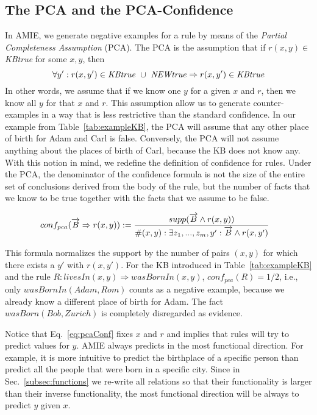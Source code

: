 \subsection{The PCA and the PCA-Confidence}\label{subsubsec:pcaConf}

In AMIE, we generate negative examples for a rule by means of the \emph{Partial Completeness Assumption} (PCA).
The PCA is the assumption that if $r(x,y) \in$ \emph{KBtrue} for some $x,y$, then
\[\forall y': r(x,y') \in \mbox{\emph{KBtrue}}\ \cup\ \mbox{\emph{NEWtrue}} \Rightarrow r(x,y') \in \mbox{\emph{KBtrue}}\]
In other words, we assume that if we know one $y$ for a given $x$ and $r$, then we know all $y$ for that $x$ and $r$.
This assumption allow us to generate counter-examples in a way that is less restrictive than the standard confidence.
In our example from Table~\ref{tab:exampleKB}, the PCA will assume that any other place of birth for 
Adam and Carl is false. Conversely, the PCA will not assume anything about the places of birth of Carl, because
the KB does not know any.
With this notion in mind, we redefine the definition of confidence for rules. Under the PCA, 
the denominator of the confidence formula is not the size of the entire set of conclusions 
derived from the body of the rule,
but the number of facts that we know to be true together with the facts that we assume to be false.

\begin{small}
\begin{equation} \label{eq:pcaConf}
 \hspace*{-2ex}
conf_{pca}(\vec{B} \Rightarrow r(x,y)) := \frac{supp(\vec{B} \wedge r(x,y))}{\#(x,y): \exists z_1,...,z_m,y': \vec{B} \wedge r(x,y')}
\end{equation}
\end{small}

This formula normalizes the support by the number of pairs $(x,y)$ for which there exists a $y'$ with $r(x,y')$.
For the KB introduced in Table~\ref{tab:exampleKB} and the rule $R: livesIn(x,y)\Rightarrow wasBornIn(x,y)$,
$conf_{pca}(R)=1/2$, i.e., only $wasBornIn(Adam, Rom)$ counts as a negative example, 
because we already know a different place of birth for Adam. The fact $wasBorn(Bob,Zurich)$ is completely disregarded as evidence.

Notice that Eq.~\ref{eq:pcaConf} fixes $x$ and $r$ and implies that rules will try to predict values for $y$. 
AMIE always predicts in the most functional direction. For example, 
it is more intuitive to predict the birthplace of a specific person 
than predict all the people that were born in a specific city.
Since in Sec.~\ref{subsec:functions} we re-write all relations so that their functionality 
is larger than their inverse functionality, the most functional direction 
will be always to predict $y$ given $x$.

